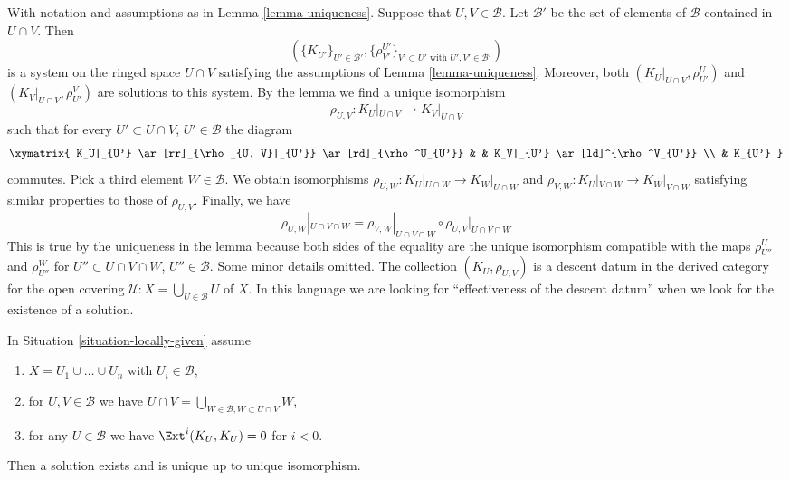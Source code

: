 \begin{remark}
\label{remark-uniqueness}
With notation and assumptions as in Lemma \ref{lemma-uniqueness}.
Suppose that $U, V \in \mathcal{B}$. Let $\mathcal{B}'$ be the set of
elements of $\mathcal{B}$ contained in $U \cap V$. Then
$$
(\{K_{U'}\}_{U' \in \mathcal{B}'},
\{\rho_{V'}^{U'}\}_{V' \subset U'\text{ with }U', V' \in \mathcal{B}'})
$$
is a system on the ringed space $U \cap V$
satisfying the assumptions of Lemma \ref{lemma-uniqueness}.
Moreover, both $(K_U|_{U \cap V}, \rho^U_{U'})$ and
$(K_V|_{U \cap V}, \rho^V_{U'})$ are solutions to this system.
By the lemma we find a unique isomorphism
$$
\rho_{U, V} : K_U|_{U \cap V} \longrightarrow K_V|_{U \cap V}
$$
such that for every $U' \subset U \cap V$, $U' \in \mathcal{B}$ the
diagram
$$
\xymatrix{
K_U|_{U'} \ar[rr]_{\rho_{U, V}|_{U'}} \ar[rd]_{\rho^U_{U'}} & &
K_V|_{U'} \ar[ld]^{\rho^V_{U'}} \\
& K_{U'}
}
$$
commutes. Pick a third element $W \in \mathcal{B}$. We obtain isomorphisms
$\rho_{U, W} : K_U|_{U \cap W} \to K_W|_{U \cap W}$ and
$\rho_{V, W} : K_U|_{V \cap W} \to K_W|_{V \cap W}$ satisfying
similar properties to those of $\rho_{U, V}$. Finally,
we have
$$
\rho_{U, W}|_{U \cap V \cap W} =
\rho_{V, W}|_{U \cap V \cap W} \circ \rho_{U, V}|_{U \cap V \cap W}
$$
This is true by the uniqueness in the lemma
because both sides of the equality are the unique isomorphism
compatible with the maps $\rho^U_{U''}$ and $\rho^W_{U''}$
for $U'' \subset U \cap V \cap W$, $U'' \in \mathcal{B}$.
Some minor details omitted.
The collection $(K_U, \rho_{U, V})$ is a descent datum
in the derived category for the open covering
$\mathcal{U} : X = \bigcup_{U \in \mathcal{B}} U$ of $X$.
In this language we are looking for ``effectiveness of the descent datum''
when we look for the existence of a solution.
\end{remark}

\begin{lemma}
\label{lemma-solution-in-finite-case}
In Situation \ref{situation-locally-given} assume
\begin{enumerate}
\item $X = U_1 \cup \ldots \cup U_n$ with $U_i \in \mathcal{B}$,
\item for $U, V \in \mathcal{B}$ we have
$U \cap V = \bigcup_{W \in \mathcal{B}, W \subset U \cap V} W$,
\item for any $U \in \mathcal{B}$ we have $\Ext^i(K_U, K_U) = 0$
for $i < 0$.
\end{enumerate}
Then a solution exists and is unique up to unique isomorphism.
\end{lemma}

